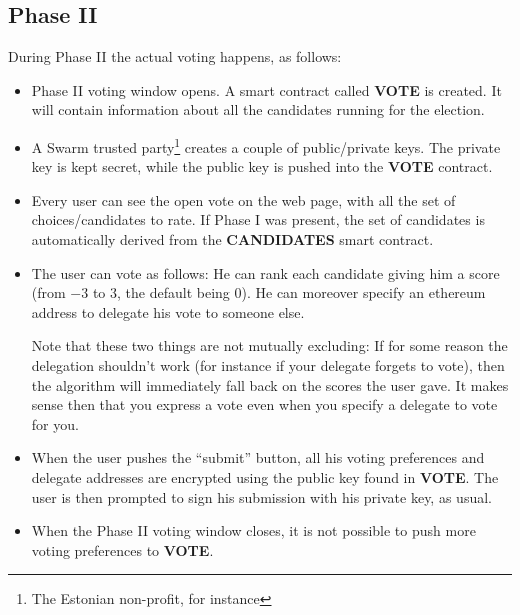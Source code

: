 \documentclass[submission, copyright,creativecommons,sharealike,noncommercial]{eptcs}
\newcommand{\Candidates}{\textbf{CANDIDATES}\xspace}
\newcommand{\Vote}{\textbf{VOTE}\xspace}
\begin{document}
\subsection{Phase II}
	During Phase II the actual voting happens, as follows:
	\begin{itemize}
		\item Phase II voting window opens. A smart contract called \Vote is created. It will contain information about all the candidates running for the election.
		
		\item A Swarm trusted party\footnote{The Estonian non-profit, for instance} creates a couple of public/private keys. The private key is kept secret, while the public key is pushed into the \Vote contract.
		
		\item Every user can see the open vote on the web page, with all the set of choices/candidates to rate. If Phase I was present, the set of candidates is automatically derived from the \Candidates smart contract. 
		
		\item The user can vote as follows: He can rank each candidate giving him a score (from $-3$ to $3$, the default being $0$). He can moreover specify an ethereum address to delegate his vote to someone else. 
		
		Note that these two things are not mutually excluding: If for some reason the delegation shouldn't work (for instance if your delegate forgets to vote), then the algorithm will immediately fall back on the scores the user gave. It makes sense then that you express a vote even when you specify a delegate to vote for you.
		
		\item When the user pushes the ``submit'' button, all his voting preferences and delegate addresses are encrypted using the public key found in \Vote. The user is then prompted to sign his submission with his private key, as usual.
		
		\item When the Phase II voting window closes, it is not possible to push more voting preferences to \Vote.
	\end{itemize}
\end{document}
